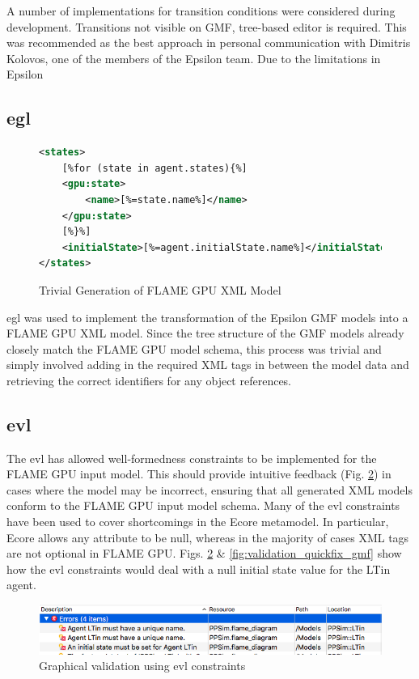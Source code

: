 \documentclass{UoYCSproject}
\begin{document}


A number of implementations for transition conditions were considered during development.
Transitions not visible on GMF, tree-based editor is required.
This was recommended as the best approach in personal communication with Dimitris Kolovos, one of the members of the Epsilon team.
Due to the limitations in Epsilon

\subsection{\gls{egl}}
\begin{figure}
\centering
\begin{lstlisting}[language=XML, basicstyle=\tiny]
<states>
    [%for (state in agent.states){%]
    <gpu:state>
        <name>[%=state.name%]</name>
    </gpu:state>
    [%}%]
    <initialState>[%=agent.initialState.name%]</initialState>
</states>
\end{lstlisting}
\caption{Trivial Generation of \gls{FLAME GPU} XML Model}
\label{fig:egl_example}
\end{figure}

\gls{egl} was used to implement the transformation of the Epsilon GMF models into a \gls{FLAME GPU} XML model.
Since the tree structure of the GMF models already closely match the \gls{FLAME GPU} model schema, this process was trivial and simply involved adding in the required XML tags in between the model data and retrieving the correct identifiers for any object references.

\subsection{\acrfull{evl}}
The \gls{evl} has allowed well-formedness constraints to be implemented for the \gls{FLAME GPU} input model.
This should provide intuitive feedback (Fig. \ref{fig:validation_gmf}) in cases where the model may be incorrect, ensuring that all generated XML models conform to the \gls{FLAME GPU} input model schema.
Many of the \gls{evl} constraints have been used to cover shortcomings in the Ecore metamodel.
In particular, Ecore allows any attribute to be null, whereas in the majority of cases XML tags are not optional in \gls{FLAME GPU}.
Figs. \ref{fig:validation_gmf} \& \ref{fig:validation_quickfix_gmf} show how the \gls{evl} constraints would deal with a null initial state value for the \gls{LTin} agent.

\begin{figure}[htp]
\centering
\includegraphics[width=\textwidth]{Appendix/validation_gmf}
\caption{Graphical validation using \gls{evl} constraints}
\label{fig:validation_gmf}
\end{figure}
\end{document}

